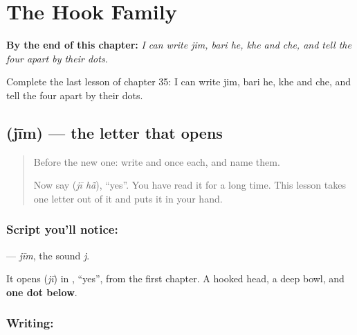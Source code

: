 
\chapter{The Hook Family}
\label{ch:ur-letters-hook-family}

\begin{chapteropening}
\textbf{By the end of this chapter:} \emph{I can write jim, bari he, khe and che, and tell the four apart by their dots.}

Complete the last lesson of chapter 35: I can write jim, bari he, khe and che, and tell the four apart by their dots.
\end{chapteropening}

\section[\texorpdfstring{\ur{ج} (jīm)}{ج (jīm)}]{ (jīm) — the letter that opens }

\label{lesson:UR-W35-jim}



\begin{quote}
Before the new one: write  and  once each, and name them.

Now say \textbf{ } (\emph{jī hā̃}), \textquotedblleft{}yes\textquotedblright{}. You have read it for a long time. This lesson takes one letter out of it and puts it in your hand.
\end{quote}

\subsection*{Script you'll notice: }
\textbf{} — \emph{jīm}, the sound \emph{j}.

It opens \textbf{} (\emph{jī}) in \textbf{ }, \textquotedblleft{}yes\textquotedblright{}, from the first chapter. A hooked head, a deep bowl, and \textbf{one dot below}.

\subsection*{Writing: }

